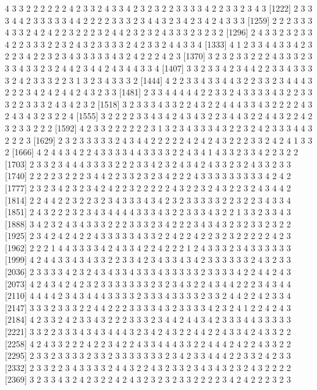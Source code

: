 \begin{Schunk}
\begin{Soutput}
[1185] 4 3 3 2 2 2 2 2 2 4 2 3 3 2 4 3 3 4 2 3 2 3 2 2 3 3 3 3 4 2 2 3 3 2 3 4 3
[1222] 2 3 3 3 4 4 2 3 3 3 3 3 4 4 2 2 2 2 3 3 3 2 3 4 4 3 2 3 4 2 3 4 2 4 3 3 3
[1259] 2 2 2 3 3 3 4 3 3 2 4 2 4 2 2 3 2 2 2 3 2 4 4 2 3 2 3 2 4 3 3 3 2 3 2 3 2
[1296] 2 4 3 3 2 3 2 3 3 4 2 2 3 3 3 2 2 3 2 4 3 2 3 3 3 3 2 4 2 3 3 2 4 4 3 3 4
[1333] 4 1 2 3 3 4 4 3 3 4 2 3 2 2 3 4 2 2 3 2 3 4 3 3 3 3 3 4 3 2 4 2 2 2 4 2 3
[1370] 3 2 3 2 3 3 2 2 2 4 3 3 3 2 3 3 3 4 3 3 2 3 2 4 4 2 3 4 4 2 4 3 4 4 3 3 4
[1407] 3 3 2 3 3 4 2 3 4 4 2 2 3 3 4 3 3 3 3 2 4 2 3 3 3 2 2 3 1 3 2 3 4 3 3 3 2
[1444] 4 2 2 3 3 4 3 3 4 4 3 2 2 3 3 2 3 4 4 4 3 2 2 2 3 4 2 4 2 4 4 2 4 3 2 3 3
[1481] 2 3 3 4 4 4 4 4 2 2 3 3 2 4 3 3 3 3 4 3 2 2 3 3 3 2 2 3 3 3 2 4 3 4 2 3 2
[1518] 3 2 3 3 3 4 3 3 2 2 4 3 2 2 4 4 4 3 3 4 3 2 2 2 2 4 3 2 4 3 4 3 2 3 2 2 4
[1555] 3 2 2 2 2 3 3 4 3 4 2 4 3 4 3 2 2 3 4 4 3 2 2 4 4 3 2 2 4 2 3 2 3 3 2 2 2
[1592] 4 2 3 3 2 2 2 2 2 2 3 1 3 2 3 4 3 3 3 4 3 2 2 3 2 4 2 3 3 3 4 4 3 2 2 2 3
[1629] 2 3 2 3 3 3 3 3 2 4 3 4 4 2 2 2 2 2 4 2 4 2 4 3 2 2 2 3 3 2 4 2 4 1 3 3 2
[1666] 4 2 4 4 3 4 2 2 4 3 3 3 3 4 4 3 3 3 3 2 2 4 3 4 1 4 3 3 2 3 3 4 2 2 3 2 2
[1703] 2 3 3 2 3 4 4 4 3 3 3 3 2 2 2 3 3 4 2 3 2 4 3 4 2 4 3 3 2 3 2 4 3 3 2 3 3
[1740] 2 2 2 2 3 2 2 2 3 4 4 2 2 3 3 2 3 2 3 4 2 2 2 4 3 3 3 3 3 3 3 3 3 4 2 4 2
[1777] 2 3 2 3 4 2 3 2 3 4 2 4 2 2 3 2 2 2 2 2 4 3 2 2 3 2 4 3 2 2 3 2 4 3 4 4 2
[1814] 2 2 4 4 2 2 3 2 2 3 2 3 4 3 3 3 4 3 4 2 3 2 3 3 3 3 3 2 2 3 2 2 3 4 3 3 4
[1851] 2 4 3 2 2 2 3 2 3 4 3 4 4 4 4 3 3 3 4 3 2 2 3 3 3 4 3 2 2 1 3 3 2 3 3 4 3
[1888] 3 4 2 3 2 4 3 4 3 3 3 2 2 2 3 3 3 2 3 4 2 2 2 3 4 3 4 3 2 3 2 3 3 2 3 2 2
[1925] 2 3 4 2 4 2 4 2 2 4 3 3 3 3 3 4 3 3 2 2 4 2 2 4 2 2 3 2 3 2 2 2 2 2 4 2 3
[1962] 2 2 2 1 4 4 3 3 3 3 4 2 4 3 3 4 2 2 4 2 2 2 1 2 4 3 3 3 2 3 4 3 3 3 3 3 3
[1999] 4 2 4 4 3 3 4 3 4 3 3 2 2 3 3 4 2 3 4 3 3 4 3 4 2 3 3 3 3 3 3 2 4 3 2 3 3
[2036] 2 3 3 3 3 4 2 3 2 4 3 4 3 3 4 3 3 3 4 3 3 3 3 3 2 3 3 3 3 4 2 2 4 4 2 4 3
[2073] 4 2 4 3 4 2 4 2 3 2 3 3 3 3 3 3 3 2 3 2 3 4 3 2 2 4 3 4 4 2 2 2 3 4 3 4 4
[2110] 4 4 4 4 2 3 4 3 4 4 4 3 3 3 3 2 3 3 3 4 3 3 3 3 2 3 3 2 4 4 2 2 4 2 3 3 4
[2147] 3 3 3 2 3 3 3 2 2 4 4 2 2 2 3 3 3 3 4 3 2 3 3 3 3 4 2 3 2 4 1 2 2 4 2 4 3
[2184] 4 2 3 3 2 4 2 3 3 4 3 2 2 2 3 3 3 2 3 4 4 2 4 4 3 4 2 3 3 3 4 4 3 3 3 3 3
[2221] 3 3 2 2 3 3 3 4 3 4 3 4 4 4 3 2 3 4 2 4 3 2 2 4 4 2 2 4 3 3 4 2 4 3 3 2 2
[2258] 4 2 4 3 3 2 2 2 4 2 2 3 4 2 2 4 3 3 4 4 4 3 3 2 2 4 4 4 2 4 2 2 4 3 3 2 2
[2295] 2 3 3 2 3 3 3 3 2 3 3 2 3 3 3 3 3 3 3 2 3 4 2 3 3 4 4 4 2 2 3 3 2 4 2 3 3
[2332] 2 3 3 2 2 3 4 3 3 3 3 2 4 4 3 2 2 4 3 2 3 3 2 3 4 3 4 3 2 3 2 4 3 2 2 2 2
[2369] 3 2 3 3 4 3 2 4 2 3 2 2 4 2 4 3 2 3 2 3 2 3 3 2 2 2 2 3 4 2 4 2 2 2 3 2 3

\end{Soutput}
\end{Schunk}
